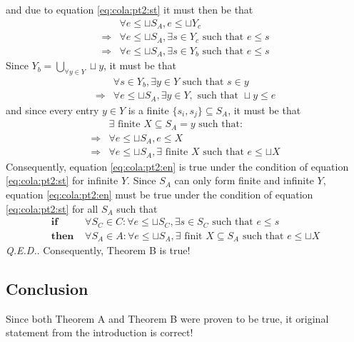 and due to equation \ref{eq:cola:pt2:st} it must then be that 
\begin{align}
						& \forall e \leq \sqcup S_A, e \leq \sqcup Y_c \\
\Rightarrow & \forall e \leq \sqcup S_A, \exists s \in Y_c \text{ such that } e \leq s \\
\Rightarrow & \forall e \leq \sqcup S_A, \exists s \in Y_b \text{ such that } e \leq s
\end{align}
Since $Y_b = \bigcup_{\forall y \in Y} \sqcup y$, it must be that
\begin{align}
						& \forall s \in Y_b, \exists y \in Y \text{ such that } s \in y \\
\Rightarrow	&	\forall e \leq \sqcup S_A, \exists y \in Y, \text{ such that } \sqcup y \leq e
\end{align}
and since every entry $y \in Y$ is a finite $\{s_i,s_j\} \subseteq S_A$, it must be that
\begin{align}
						& \exists \text{ finite } X \subseteq S_A = y \text{ such that:} \\
\Rightarrow	&	\forall e \leq \sqcup S_A, e \leq X \\
\Rightarrow & \forall e \leq \sqcup S_A, \exists \text{ finite } X \text{ such that } e \leq \sqcup X
\end{align}
Consequently, equation \ref{eq:cola:pt2:en} is true under the condition of equation \ref{eq:cola:pt2:st} for infinite $Y$. Since $S_A$ can only form finite and infinite $Y$, equation \ref{eq:cola:pt2:en} must be true under the condition of equation \ref{eq:cola:pt2:st} for all $S_A$ such that
\begin{align}
	\textbf{if }		& \forall S_C \in C: \forall e \leq \sqcup S_C,
										\exists s \in S_C \text{ such that } e \leq s \\
	\textbf{then }	& \forall S_A \in A: \forall e \leq \sqcup S_A,
										\exists \text{ finit } X \subseteq S_A \text{ such that } e \leq \sqcup X
\end{align}
\emph{Q.E.D.}. Consequently, Theorem B is true!

\subsection{Conclusion}
Since both Theorem A and Theorem B were proven to be true, it original statement from the introduction is correct!